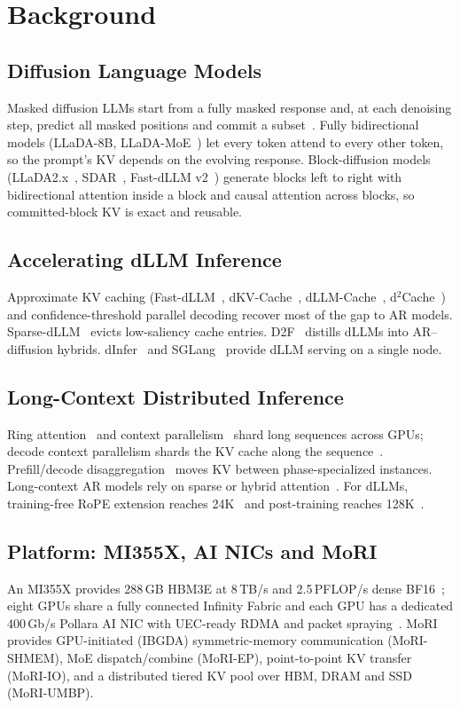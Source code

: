 \section{Background}
\label{sec:background}

\subsection{Diffusion Language Models}
Masked diffusion LLMs start from a fully masked response and, at each denoising step, predict all
masked positions and commit a subset~\cite{nie2025llada,ye2025dream}. Fully bidirectional models
(LLaDA-8B, LLaDA-MoE~\cite{zhu2025lladamoe}) let every token attend to every other token, so the
prompt's KV depends on the evolving response. Block-diffusion models~\cite{arriola2025blockdiffusion}
(LLaDA2.x~\cite{bie2025llada2,bie2026llada21}, SDAR~\cite{cheng2025sdar}, Fast-dLLM
v2~\cite{wu2025fastdllmv2}) generate blocks left to right with bidirectional attention inside a block
and causal attention across blocks, so committed-block KV is exact and reusable.

\subsection{Accelerating dLLM Inference}
Approximate KV caching (Fast-dLLM~\cite{wu2025fastdllm}, dKV-Cache~\cite{ma2025dkvcache},
dLLM-Cache~\cite{liu2025dllmcache}, d$^2$Cache~\cite{jiang2025d2cache}) and confidence-threshold
parallel decoding recover most of the gap to AR models. Sparse-dLLM~\cite{song2025sparsedllm}
evicts low-saliency cache entries. D2F~\cite{wang2025d2f} distills dLLMs into AR--diffusion hybrids.
dInfer~\cite{ma2025dinfer} and SGLang~\cite{sglangdllm} provide dLLM serving on a single node.

\subsection{Long-Context Distributed Inference}
Ring attention~\cite{liu2023ringattention} and context parallelism~\cite{yang2024contextparallel}
shard long sequences across GPUs; decode context parallelism shards the KV cache along the
sequence~\cite{vllmdcp,chen2026nanocp}. Prefill/decode disaggregation~\cite{zhong2024distserve,
qin2024mooncake} moves KV between phase-specialized instances. Long-context AR models rely on sparse
or hybrid attention~\cite{yang2025qwen25_1m,deepseek2025v32}. For dLLMs, training-free RoPE
extension reaches 24K~\cite{liu2025longllada} and post-training reaches 128K~\cite{he2025ultrallada}.

\subsection{Platform: MI355X, AI NICs and MoRI}
An MI355X provides 288\,GB HBM3E at 8\,TB/s and 2.5\,PFLOP/s dense BF16~\cite{mi355x}; eight GPUs
share a fully connected Infinity Fabric and each GPU has a dedicated 400\,Gb/s Pollara AI NIC with
UEC-ready RDMA and packet spraying~\cite{pollara}. MoRI~\cite{mori} provides GPU-initiated (IBGDA)
symmetric-memory communication (MoRI-SHMEM), MoE dispatch/combine (MoRI-EP), point-to-point KV
transfer (MoRI-IO), and a distributed tiered KV pool over HBM, DRAM and SSD (MoRI-UMBP).
